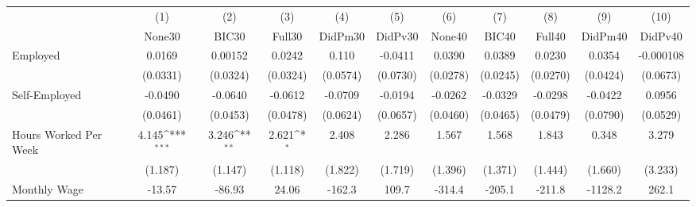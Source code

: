 {
\def\sym#1{\ifmmode^{#1}\else\(^{#1}\)\fi}
\begin{tabular}{l*{10}{c}}
\toprule
            &\multicolumn{1}{c}{(1)}&\multicolumn{1}{c}{(2)}&\multicolumn{1}{c}{(3)}&\multicolumn{1}{c}{(4)}&\multicolumn{1}{c}{(5)}&\multicolumn{1}{c}{(6)}&\multicolumn{1}{c}{(7)}&\multicolumn{1}{c}{(8)}&\multicolumn{1}{c}{(9)}&\multicolumn{1}{c}{(10)}\\
            &\multicolumn{1}{c}{None30}&\multicolumn{1}{c}{BIC30}&\multicolumn{1}{c}{Full30}&\multicolumn{1}{c}{DidPm30}&\multicolumn{1}{c}{DidPv30}&\multicolumn{1}{c}{None40}&\multicolumn{1}{c}{BIC40}&\multicolumn{1}{c}{Full40}&\multicolumn{1}{c}{DidPm40}&\multicolumn{1}{c}{DidPv40}\\
\midrule
Employed    &      0.0169         &     0.00152         &      0.0242         &       0.110         &     -0.0411         &      0.0390         &      0.0389         &      0.0230         &      0.0354         &   -0.000108         \\
            &    (0.0331)         &    (0.0324)         &    (0.0324)         &    (0.0574)         &    (0.0730)         &    (0.0278)         &    (0.0245)         &    (0.0270)         &    (0.0424)         &    (0.0673)         \\
\addlinespace
Self-Employed&     -0.0490         &     -0.0640         &     -0.0612         &     -0.0709         &     -0.0194         &     -0.0262         &     -0.0329         &     -0.0298         &     -0.0422         &      0.0956         \\
            &    (0.0461)         &    (0.0453)         &    (0.0478)         &    (0.0624)         &    (0.0657)         &    (0.0460)         &    (0.0465)         &    (0.0479)         &    (0.0790)         &    (0.0529)         \\
\addlinespace
Hours Worked Per Week&       4.145\sym{***}&       3.246\sym{**} &       2.621\sym{*}  &       2.408         &       2.286         &       1.567         &       1.568         &       1.843         &       0.348         &       3.279         \\
            &     (1.187)         &     (1.147)         &     (1.118)         &     (1.822)         &     (1.719)         &     (1.396)         &     (1.371)         &     (1.444)         &     (1.660)         &     (3.233)         \\
\addlinespace
Monthly Wage&      -13.57         &      -86.93         &       24.06         &      -162.3         &       109.7         &      -314.4         &      -205.1         &      -211.8         &     -1128.2         &       262.1         \\

\end{tabular}}

